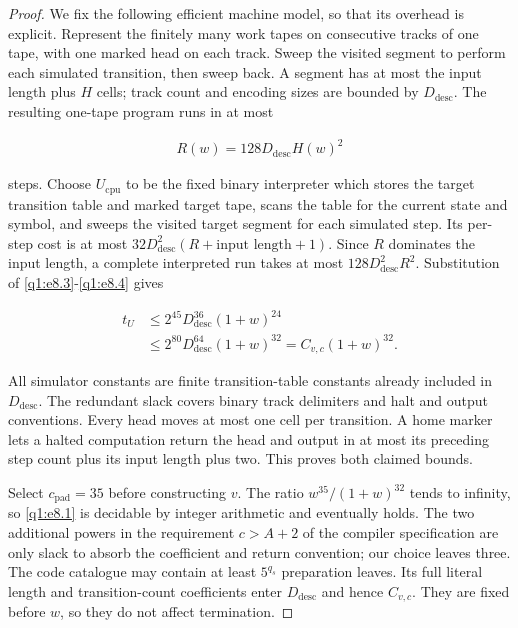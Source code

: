 \begin{proof}
We fix the following efficient machine model, so that its overhead is explicit. Represent the finitely many work tapes on consecutive tracks of one tape, with one marked head on each track. Sweep the visited segment to perform each simulated transition, then sweep back. A segment has at most the input length plus \(H\) cells; track count and encoding sizes are bounded by \(D_{\mathrm{desc}}\). The resulting one-tape program runs in at most

\begin{equation}\label{q1:e8.4}
\begin{gathered}
R(w)=128 D_{\mathrm{desc}} H(w)^{2}
\end{gathered}
\end{equation}

steps. Choose \(U_{\mathrm{cpu}}\) to be the fixed binary interpreter which stores the target transition table and marked target tape, scans the table for the current state and symbol, and sweeps the visited target segment for each simulated step. Its per-step cost is at most \(32D_{\mathrm{desc}}^{2}(R+\text{input length}+1)\). Since \(R\) dominates the input length, a complete interpreted run takes at most \(128D_{\mathrm{desc}}^{2} R^{2}\). Substitution of \eqref{q1:e8.3}-\eqref{q1:e8.4} gives

\begin{equation}\label{q1:e8.5}
\begin{aligned}
t_{U} &\le 2^{45} D_{\mathrm{desc}}^{36}(1+w)^{24}\\
&\le 2^{80} D_{\mathrm{desc}}^{64}(1+w)^{32} = C_{v,c}(1+w)^{32}.
\end{aligned}
\end{equation}

All simulator constants are finite transition-table constants already included in \(D_{\mathrm{desc}}\). The redundant slack covers binary track delimiters and halt and output conventions. Every head moves at most one cell per transition. A home marker lets a halted computation return the head and output in at most its preceding step count plus its input length plus two. This proves both claimed bounds.

Select \(c_{\mathrm{pad}}=35\) before constructing \(v\). The ratio \(w^{35}/(1+w)^{32}\) tends to infinity, so \eqref{q1:e8.1} is decidable by integer arithmetic and eventually holds. The two additional powers in the requirement \(c>A+2\) of the compiler specification are only slack to absorb the coefficient and return convention; our choice leaves three. The code catalogue may contain at least \(5^{q_{s}}\) preparation leaves. Its full literal length and transition-count coefficients enter \(D_{\mathrm{desc}}\) and hence \(C_{v,c}\). They are fixed before \(w\), so they do not affect termination.


\end{proof}

